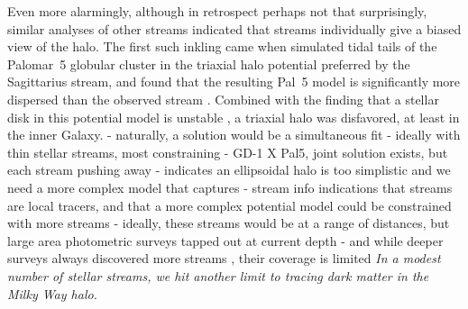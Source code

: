 \documentclass[final,5p,times,twocolumn,authoryear]{elsarticle}
\begin{document}
Even more alarmingly, although in retrospect perhaps not that surprisingly, similar analyses of other streams indicated that streams individually give a biased view of the halo.
The first such inkling came when \citet{pearson:2015} simulated tidal tails of the Palomar~5 globular cluster in the triaxial halo potential preferred by the Sagittarius stream, and found that the resulting Pal~5 model is significantly more dispersed than the observed stream \citep{odenkirchen:2001, rockosi:2002}.
Combined with the finding that a stellar disk in this potential model is unstable \citep{debattista:2013}, a triaxial halo was disfavored, at least in the inner Galaxy.
- naturally, a solution would be a simultaneous fit
- ideally with thin stellar streams, most constraining \citep{lux}
- GD-1 X Pal5, joint solution exists, but each stream pushing away \citep{bovy}
- indicates an ellipsoidal halo is too simplistic and we need a more complex model that captures \citep{halo_shapes, lowing}
- stream info indications that streams are local tracers, and that a more complex potential model could be constrained with more streams \citep{bh:2018}
- ideally, these streams would be at a range of distances, but large area photometric surveys tapped out at current depth
- and while deeper surveys always discovered more streams \citep{pandas, des}, their coverage is limited
\emph{In a modest number of stellar streams, we hit another limit to tracing dark matter in the Milky Way halo.}
\end{document}
